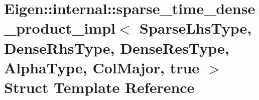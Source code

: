 \hypertarget{struct_eigen_1_1internal_1_1sparse__time__dense__product__impl_3_01_sparse_lhs_type_00_01_dense_4902bcccfe44923f57955b34ebedf211}{}\section{Eigen\+::internal\+::sparse\+\_\+time\+\_\+dense\+\_\+product\+\_\+impl$<$ Sparse\+Lhs\+Type, Dense\+Rhs\+Type, Dense\+Res\+Type, Alpha\+Type, Col\+Major, true $>$ Struct Template Reference}
\label{struct_eigen_1_1internal_1_1sparse__time__dense__product__impl_3_01_sparse_lhs_type_00_01_dense_4902bcccfe44923f57955b34ebedf211}
